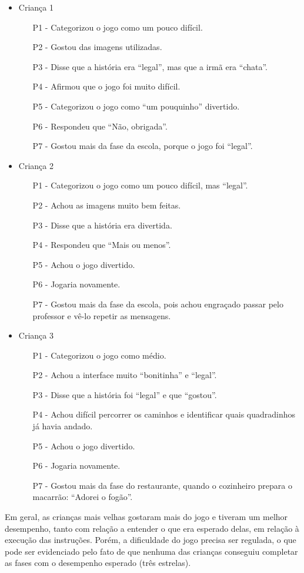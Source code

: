 \begin{itemize}
	\item Criança 1
	\begin{itemize}
		\item[P1] - Categorizou o jogo como um pouco difícil.
		\item[P2] - Gostou das imagens utilizadas.
		\item[P3] - Disse que a história era “legal”, mas que a irmã era “chata”.
		\item[P4] - Afirmou que o jogo foi muito difícil.
		\item[P5] - Categorizou o jogo como “um pouquinho” divertido.
		\item[P6] - Respondeu que “Não, obrigada”.
		\item[P7] - Gostou mais da fase da escola, porque o jogo foi “legal”.
	\end{itemize}
	\item Criança 2
	\begin{itemize}
		\item[P1] - Categorizou o jogo como um pouco difícil, mas “legal”.
		\item[P2] - Achou as imagens muito bem feitas.
		\item[P3] - Disse que a história era divertida.
		\item[P4] - Respondeu que “Mais ou menos”.
		\item[P5] - Achou o jogo divertido.
		\item[P6] - Jogaria novamente.
		\item[P7] - Gostou mais da fase da escola, pois achou engraçado passar pelo professor e vê-lo repetir as mensagens.
	\end{itemize}
	\item Criança 3
	\begin{itemize}
		\item[P1] - Categorizou o jogo como médio.
		\item[P2] - Achou a interface muito “bonitinha” e “legal”.
		\item[P3] - Disse que a história foi “legal” e que “gostou”.
		\item[P4] - Achou difícil percorrer os caminhos e identificar quais quadradinhos já havia andado.
		\item[P5] - Achou o jogo divertido.
		\item[P6] - Jogaria novamente.
		\item[P7] - Gostou mais da fase do restaurante, quando o cozinheiro prepara o macarrão: “Adorei o fogão”.
	\end{itemize}
\end{itemize}

Em geral, as crianças mais velhas gostaram mais do jogo e tiveram um melhor desempenho, tanto com relação a entender o que era esperado delas, em relação à execução das instruções. Porém, a dificuldade do jogo precisa ser regulada, o que pode ser evidenciado pelo fato de que nenhuma das crianças conseguiu completar as fases com o desempenho esperado (três estrelas).